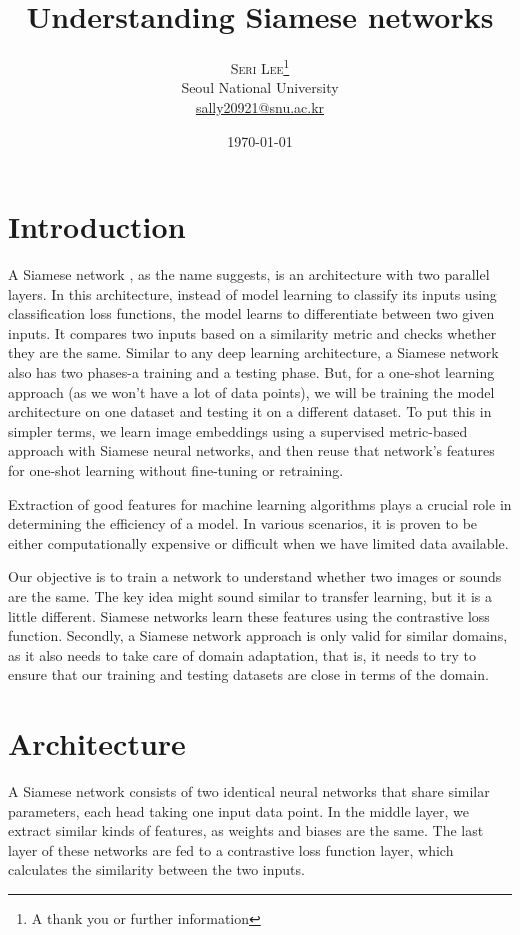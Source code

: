 \documentclass[twoside,twocolumn]{article}
\title{Understanding Siamese networks} %
\author{%
\textsc{Seri Lee}\thanks{A thank you or further information} \\[1ex] %
\normalsize Seoul National University \\ %
\normalsize \href{mailto:sally20921@snu.ac.kr}{sally20921@snu.ac.kr} %
}
\date{\today} %
\begin{document}
\maketitle


\section{Introduction}
A Siamese network \cite{b1}, as the name suggests, is an architecture with two parallel layers.
In this architecture, instead of model learning to classify its inputs using classification loss functions, the model learns to 
differentiate between two given inputs. It compares two inputs based on a similarity metric and checks whether they are the same. 
Similar to any deep learning architecture, a Siamese network also has two phases-a training and a testing phase. 
But, for a one-shot learning approach (as we won't have a lot of data points), we will be training the model architecture on one dataset and testing it on a different dataset.
To put this in simpler terms, we learn image embeddings using a supervised metric-based approach with Siamese neural networks, and then reuse that network's features for one-shot learning without fine-tuning or retraining.

Extraction of good features for machine learning algorithms plays a crucial role in determining the efficiency of a model.
In various scenarios, it is proven to be either computationally expensive or difficult when we have limited data available.

Our objective is to train a network to understand whether two images or sounds are the same.
The key idea might sound similar to transfer learning, but it is a little different. Siamese networks learn these features using the contrastive loss function.
 Secondly, a Siamese network approach is only valid for similar domains, as it also needs to take care of domain adaptation, that is, it needs to try to ensure that our training and testing datasets are close in terms of the domain.
 
\section{Architecture}
A Siamese network consists of two identical neural networks that share similar parameters, each head taking one input data point.
In the middle layer, we extract similar kinds of features, as weights and biases are the same. The last layer of these networks are fed to a contrastive loss function layer, which calculates the similarity between the two inputs.
\end{document}
